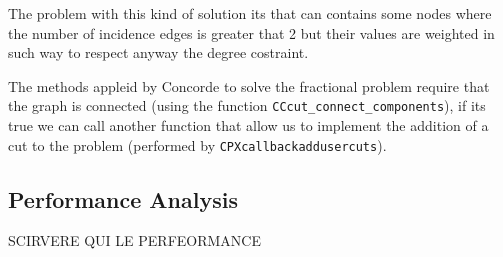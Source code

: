 The problem with this kind of solution its that can contains some nodes where the number of incidence edges is greater that 2 but their values are weighted in such way to respect anyway the degree costraint.

The methods appleid by Concorde to solve the fractional problem require that the graph is connected (using the function \verb|CCcut_connect_components|), if its true we can call another function that allow us to implement the addition of a cut to the problem (performed by \verb|CPXcallbackaddusercuts|).

\subsection{Performance Analysis}
SCIRVERE QUI LE PERFEORMANCE

